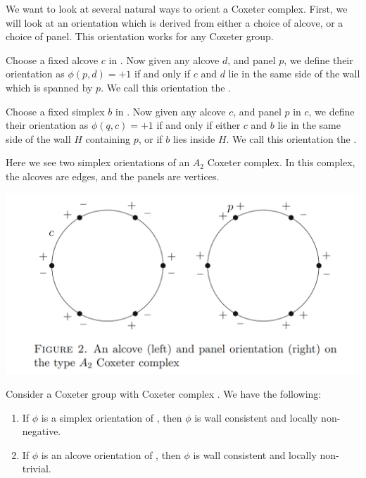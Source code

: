 \documentclass[12pt]{article}
\begin{document}
We want to look at several natural ways to orient a Coxeter complex. First, we will look at an orientation which is derived from either a choice of alcove, or a choice of panel. This orientation works for any Coxeter group.

\begin{definition}
    Choose a fixed alcove $c$ in \sg. Now given any alcove $d$, and panel $p$, we define their orientation as $\phi(p,d)=+1$ if and only if $c$ and $d$ lie in the same side of the wall which is spanned by $p$. We call this orientation the .
\end{definition}

\begin{definition}
    Choose a fixed simplex $b$ in \sg. Now given any alcove $c$, and panel $p$ in $c$, we define their orientation as $\phi(q,c)=+1$ if and only if either $c$ and $b$ lie in the same side of the wall $H$ containing $p$, or if $b$ lies inside $H$. We call this orientation the .
\end{definition}
\begin{example}
    Here we see two simplex orientations of an $A_2$ Coxeter complex. In this complex, the alcoves are edges, and the panels are vertices.
\end{example}
\includegraphics[scale=0.6]{Screenshot 2023-02-03 102201.png}\\
\begin{lemma}
    Consider a Coxeter group \W with Coxeter complex \sg. We have the following:
    \begin{enumerate}
        \item If $\phi$ is a simplex orientation of \sg, then $\phi$ is wall consistent and locally non-negative.
        \item If $\phi$ is an alcove orientation of \sg, then $\phi$ is wall consistent and locally non-trivial.
    \end{enumerate}
\end{lemma}
\end{document}
